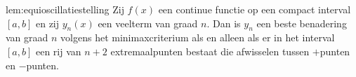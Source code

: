 \begin{lem}[Equioscillatiestelling]{lem:equioscillatiestelling}
    Zij $f(x)$ een continue functie op een compact interval $[a,b]$ en zij $y_n(x)$ een veelterm van graad $n$. Dan is $y_n$ een beste benadering van graad $n$ volgens het minimaxcriterium als en alleen als er in het interval $[a,b]$ een rij van $n+2$ extremaalpunten bestaat die afwisselen tussen $+$punten en $-$punten. 

\end{lem}
